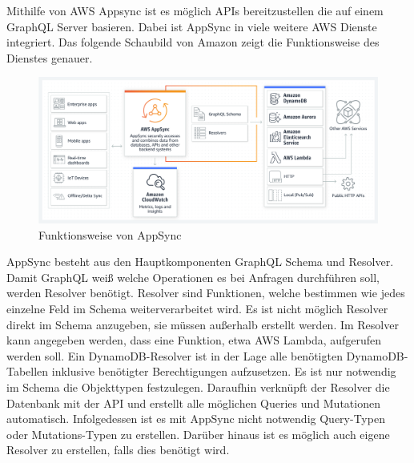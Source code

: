 Mithilfe von AWS Appsync ist es möglich APIs bereitzustellen die auf einem GraphQL Server basieren.
Dabei ist AppSync in viele weitere AWS Dienste integriert.
Das folgende Schaubild von Amazon zeigt die Funktionsweise des Dienstes genauer.
\begin{figure}[htbp]
    \centering
    \includegraphics[width=1.0\textwidth]{40-AWS/Appsync.png}
    \caption{Funktionsweise von AppSync \cite[]{AppSync}  }
    \label{fig:meine-grafik}
\end{figure}

\label{GraphQLResolver}
AppSync besteht aus den Hauptkomponenten GraphQL Schema und Resolver.
Damit GraphQL weiß welche Operationen es bei Anfragen durchführen soll, werden Resolver benötigt.
Resolver sind Funktionen, welche bestimmen wie jedes einzelne Feld im Schema weiterverarbeitet wird.
Es ist nicht möglich Resolver direkt im Schema anzugeben, sie müssen außerhalb erstellt werden.
Im Resolver kann angegeben werden, dass eine Funktion, etwa AWS Lambda, aufgerufen werden soll.
Ein DynamoDB-Resolver ist in der Lage alle benötigten DynamoDB-Tabellen inklusive benötigter Berechtigungen aufzusetzen.
Es ist nur notwendig im Schema die Objekttypen festzulegen.
Daraufhin verknüpft der Resolver die Datenbank mit der API und erstellt alle möglichen Queries und Mutationen automatisch.
Infolgedessen ist es mit AppSync nicht notwendig Query-Typen oder Mutations-Typen zu erstellen.
Darüber hinaus ist es möglich auch eigene Resolver zu erstellen, falls dies benötigt wird.

